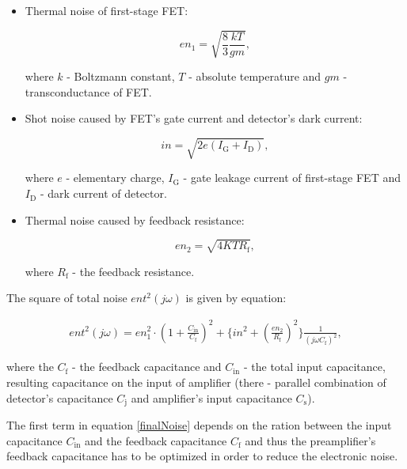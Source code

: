 \begin{itemize}

\item Thermal noise of first-stage FET:

\begin{equation}
en_1 = \sqrt{\frac{8}{3}\frac{kT}{gm}},
\end{equation}

where $k$ - Boltzmann constant, $T$ - absolute temperature and $gm$ - transconductance of FET. 

\item 

Shot noise caused by FET's gate current and detector's dark current:

\begin{equation}
in = \sqrt{2e(I_{\textrm{G}} + I_{\textrm{D}})},
\end{equation}

where $e$ - elementary charge, $I_{\textrm{G}}$ - gate leakage current of first-stage FET and $I_{\textrm{D}}$ - dark current of detector.



\item

Thermal noise caused by feedback resistance: 

\begin{equation}
en_2 = \sqrt{4KTR_{\textrm{f}}},
\end{equation}

where $R_{\textrm{f}}$ - the feedback resistance.

\end{itemize}


The square of total noise $ent^2(j \omega)$ is given by equation:


\begin{equation}
\begin{aligned}
ent^2(j \omega) = en_1^2 \cdot (1+\frac{C_{\textrm{in}}}{C_{\textrm{f}}})^2 + \{in^2 + (\frac{en_2}{R_{\textrm{f}}})^2 \}\frac{1}{(j \omega C_{\textrm{f}})^2},
\end{aligned}
\label{finalNoise}
\end{equation}

where the $C_{\textrm{f}}$ - the feedback capacitance and $C_{\textrm{in}}$ - the total input capacitance, resulting capacitance on the input of amplifier (there - parallel combination of detector's capacitance $C_{\textrm{j}}$ and amplifier's input capacitance $C_{\textrm{s}}$).   
\par
The first term in equation \ref{finalNoise} depends on the ration between the input capacitance $C_{\textrm{in}}$ and the feedback capacitance $C_{\textrm{f}}$ and thus the preamplifier's feedback capacitance has to be optimized in order to reduce the electronic noise.


